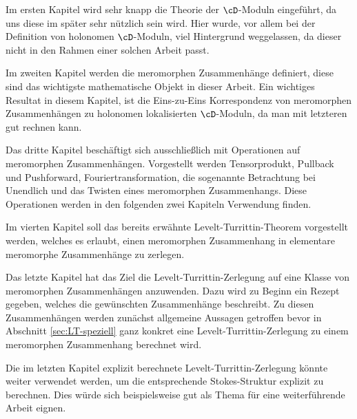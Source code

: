 Im ersten Kapitel wird sehr knapp die Theorie der $\cD$-Moduln eingeführt, da
uns diese im später sehr nützlich sein wird. Hier wurde, vor allem bei der
Definition von holonomen $\cD$-Moduln, viel Hintergrund weggelassen, da dieser
nicht in den Rahmen einer solchen Arbeit passt.\\
\begin{comment} \end{comment}
Im zweiten Kapitel werden die meromorphen Zusammenhänge definiert, diese sind
das wichtigste mathematische Objekt in dieser Arbeit.
Ein wichtiges Resultat in diesem Kapitel, ist die Eins-zu-Eins Korrespondenz
von meromorphen Zusammenhängen zu holonomen lokalisierten $\cD$-Moduln, da man
mit letzteren gut rechnen kann.\\
\begin{comment} \end{comment}
Das dritte Kapitel beschäftigt sich ausschließlich mit Operationen auf
meromorphen Zusammenhängen.
Vorgestellt werden Tensorprodukt, Pullback und Pushforward,
Fouriertransformation, die sogenannte Betrachtung bei Unendlich und das Twisten
eines meromorphen Zusammenhangs.
Diese Operationen werden in den folgenden zwei Kapiteln Verwendung finden.\\
\begin{comment} \end{comment}
Im vierten Kapitel soll das bereits erwähnte Levelt-Turrittin-Theorem
vorgestellt werden, welches es erlaubt, einen meromorphen Zusammenhang in
elementare meromorphe Zusammenhänge zu zerlegen.\\
\begin{comment} \end{comment}
Das letzte Kapitel hat das Ziel die Levelt-Turrittin-Zerlegung auf eine Klasse
von meromorphen Zusammenhängen anzuwenden.
Dazu wird zu Beginn ein Rezept gegeben, welches die gewünschten Zusammenhänge
beschreibt.
Zu diesen Zusammenhängen werden zunächst allgemeine Aussagen getroffen bevor in
Abschnitt \ref{sec:LT-speziell} ganz konkret eine Levelt-Turrittin-Zerlegung zu
einem meromorphen Zusammenhang berechnet wird.

Die im letzten Kapitel explizit berechnete Levelt-Turrittin-Zerlegung könnte
weiter verwendet werden, um die entsprechende Stokes-Struktur explizit zu
berechnen. Dies würde sich beispielsweise gut als Thema für eine weiterführende
Arbeit eignen.

\begin{comment}
Ich möchte diese Stelle nutzen, um Herrn Prof. Dr. Hien dafür zu danken, dass
er mir ermöglicht hat, mich mit diesem Thema zu beschäftigen.
Auch bedanke ich mich für die hervorragende Betreuung, welche diese Arbeit erst
ermöglicht hat.
\end{comment}

